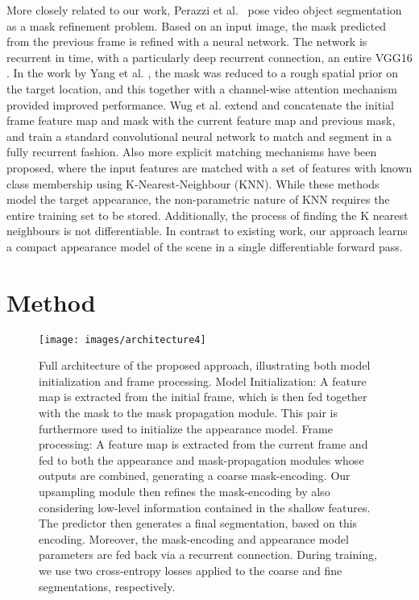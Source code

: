 \documentclass[10pt,twocolumn,letterpaper]{article}
\begin{document}
More closely related to our work, Perazzi et al.\ \cite{MSK} pose video object segmentation as a mask refinement problem. Based on an input image, the mask predicted from the previous frame is refined with a neural network. The network is recurrent in time, with a particularly deep recurrent connection, an entire VGG16 \cite{SimonyanICLR2015}. In the work by Yang et al. \cite{OSMN}, the mask was reduced to a rough spatial prior on the target location, and this together with a channel-wise attention mechanism provided improved performance. Wug et al. \cite{RGMP} extend \cite{MSK} and concatenate the initial frame feature map and mask with the current feature map and previous mask, and train a standard convolutional neural network to match and segment in a fully recurrent fashion. Also more explicit matching mechanisms have been proposed, where the input features are matched with a set of features with known class membership \cite{VM,PML} using K-Nearest-Neighbour (KNN). While these methods model the target appearance, the non-parametric nature of KNN requires the entire training set to be stored. Additionally, the process of finding the K nearest neighbours is not differentiable. In contrast to existing work, our approach learns a compact appearance model of the scene in a single differentiable forward pass.

 \section{Method}\label{sec:method}
\begin{figure*}[ht]
  \texttt{[image: images/architecture4]}
  \caption{Full architecture of the proposed approach, illustrating both model initialization and frame processing. Model Initialization: A feature map is extracted from the initial frame, which is then fed together with the mask to the mask propagation module. This pair is furthermore used to initialize the appearance model. Frame processing: A feature map is extracted from the current frame and fed to both the appearance and mask-propagation modules whose outputs are combined, generating a coarse mask-encoding. Our upsampling module then refines the mask-encoding by also considering low-level information contained in the shallow features. The predictor then generates a final segmentation, based on this encoding. Moreover, the mask-encoding and appearance model parameters are fed back via a recurrent connection. During training, we use two cross-entropy losses applied to the coarse and fine segmentations, respectively.}

  \label{fig:architecture}
\end{figure*}
\end{document}
